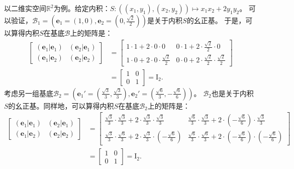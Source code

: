 \documentclass[12pt,UTF8,fontset=none]{ctexbook}
\begin{document}
以二维实空间$\mathbb{R}^2$为例。给定内积：$S: \left((x_1, y_1), (x_2, y_2) \right) \mapsto x_1 x_2 + 2 y_1 y_2$。
可以验证，$\mathcal{B}_1 = \left(\mathbf{e}_1 = (1, 0), \mathbf{e}_2 = \left(0, \frac{\sqrt{2}}{2}\right)\right)$是关于内积$S$的幺正基。
于是，可以算得内积$S$在基底$\mathcal{B}$上的矩阵是：
\begin{align*}
    \begin{bmatrix}
        (\mathbf{e}_1 |\mathbf{e}_1) & (\mathbf{e}_2 |\mathbf{e}_1) \\
        (\mathbf{e}_1 |\mathbf{e}_2) & (\mathbf{e}_2 |\mathbf{e}_2)
    \end{bmatrix} &= \begin{bmatrix}
        1\cdot 1 + 2\cdot 0\cdot 0 &  0\cdot 1 + 2 \cdot \frac{\sqrt{2}}{2} \cdot 0 \\
        1\cdot 0 + 2\cdot 0\cdot \frac{\sqrt{2}}{2} & 0\cdot 0 + 2\cdot \frac{\sqrt{2}}{2} \cdot \frac{\sqrt{2}}{2}
    \end{bmatrix}  \\
    &= \begin{bmatrix}
       1 & 0 \\
       0 & 1
    \end{bmatrix} = \mathrm{I}_2. 
\end{align*}
考虑另一组基底$\mathcal{B}_2 = \left(\mathbf{e}_1' = (\frac{\sqrt{3}}{3}, \frac{\sqrt{3}}{3}), \mathbf{e}_2' = \left(\frac{\sqrt{6}}{3}, -\frac{\sqrt{6}}{6}\right)\right)$。
$\mathcal{B}_2$也是关于内积$S$的幺正基。同样地，可以算得内积$S$在基底$\mathcal{B}_2$上的矩阵是：
\begin{align*}
    \begin{bmatrix}
        (\mathbf{e}_1 |\mathbf{e}_1) & (\mathbf{e}_2 |\mathbf{e}_1) \\
        (\mathbf{e}_1 |\mathbf{e}_2) & (\mathbf{e}_2 |\mathbf{e}_2)
    \end{bmatrix} &= \begin{bmatrix}
        \frac{\sqrt{3}}{3}\cdot \frac{\sqrt{3}}{3} + 2\cdot \frac{\sqrt{3}}{3} \cdot \frac{\sqrt{3}}{3} &  \frac{\sqrt{6}}{3}\cdot \frac{\sqrt{3}}{3} + 2\cdot \left(-\frac{\sqrt{6}}{6}\right) \cdot \frac{\sqrt{3}}{3} \\
        \frac{\sqrt{3}}{3}\cdot \frac{\sqrt{6}}{3} + 2\cdot \frac{\sqrt{3}}{3} \cdot \left(-\frac{\sqrt{6}}{6}\right) & \frac{\sqrt{6}}{3}\cdot \frac{\sqrt{6}}{3} + 2\cdot \left(-\frac{\sqrt{6}}{6}\right) \cdot \left(-\frac{\sqrt{6}}{6}\right)
    \end{bmatrix}  \\
    &= \begin{bmatrix}
       1 & 0 \\
       0 & 1
    \end{bmatrix} = \mathrm{I}_2. 
\end{align*}
\end{document}
